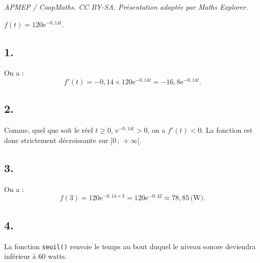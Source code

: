 \documentclass[10pt]{article}
\providecommand{\e}{{\mathrm{e}}}
\begin{document}
\noindent\textit{APMEP / CoopMaths. CC BY-SA. Présentation adaptée par Maths Explorer.}\par\medskip
\( f(t) = 120 \e^{-0{,}14t} \).

\subsection*{1.}

On a :
\[
f'(t) = -0{,}14 \times 120 \e^{-0{,}14t} = -16{,}8 \e^{-0{,}14t}.
\]

\subsection*{2.}

Comme, quel que soit le réel \(t \geqslant 0\), \(\e^{-0{,}14t} > 0\), on a \(f'(t) < 0\). La fonction est donc strictement décroissante sur \([0 \,;\, +\infty [\).

\subsection*{3.}

On a :
\[
f(3) = 120 \e^{-0{,}14 \times 3} = 120 \e^{-0{,}42} \approx 78{,}85 \, \text{(W)}.
\]

\subsection*{4.}

La fonction \texttt{seuil()} renvoie le temps au bout duquel le niveau sonore deviendra inférieur à 60 watts.
\end{document}
